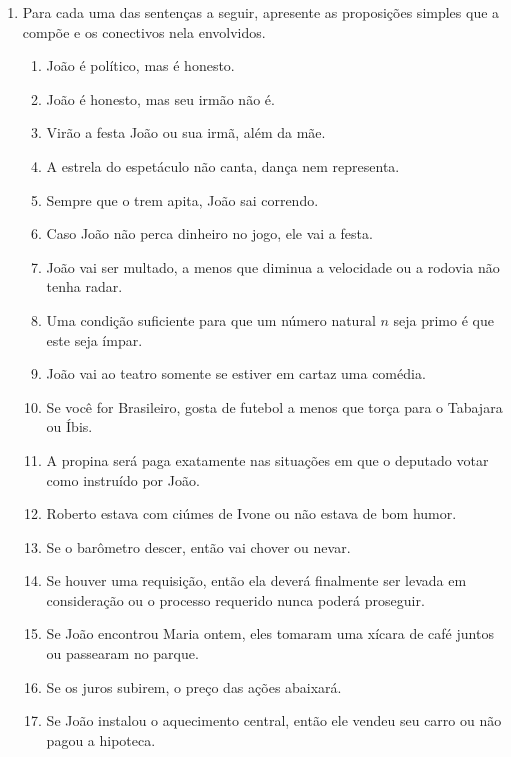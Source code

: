\begin{enumerate}
  \item Para cada uma das senten\c{c}as a seguir, apresente as proposi\c{c}\~oes simples que a comp\~oe e os conectivos nela envolvidos.
  \begin{enumerate}
     \item Jo\~ao \'e pol\'itico, mas \'e honesto.
     \item Jo\~ao \'e honesto, mas seu irm\~ao n\~ao \'e.
     \item Vir\~ao a festa Jo\~ao ou sua irm\~a, al\'em da m\~ae.
     \item A estrela do espet\'aculo n\~ao canta, dan\c{c}a nem representa.
     \item Sempre que o trem apita, Jo\~ao sai correndo.
     \item Caso Jo\~ao n\~ao perca dinheiro no jogo, ele vai a festa.
     \item Jo\~ao vai ser multado, a menos que diminua a velocidade ou a rodovia n\~ao tenha radar.
     \item Uma condi\c{c}\~ao suficiente para que um n\'umero natural $n$ seja primo \'e que este seja \'impar.
     \item Jo\~ao vai ao teatro somente se estiver em cartaz uma com\'edia.
     \item Se voc\^e for Brasileiro, gosta de futebol a menos que tor\c{c}a para o Tabajara ou \'Ibis.
     \item A propina ser\'a paga exatamente nas situa\c{c}\~oes em que
       o deputado votar como instru\'ido por Jo\~ao.
     \item Roberto estava com ciúmes de Ivone ou não estava de bom
       humor.
     \item Se o barômetro descer, então vai chover ou nevar.
     \item Se houver uma requisição, então ela deverá finalmente ser
       levada em consideração ou o processo requerido nunca poderá
       proseguir.
     \item Se João encontrou Maria ontem, eles tomaram uma xícara de
       café juntos ou passearam no parque.
     \item Se os juros subirem, o preço das ações abaixará.
     \item Se João instalou o aquecimento central, então ele vendeu
       seu carro ou não pagou a hipoteca.
 \end{enumerate}
\end{enumerate}

